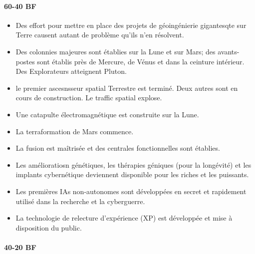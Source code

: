\paragraph{60-40 BF} 

\begin{itemize} 
   \item Des effort pour mettre en place des projets de géoingénierie
      gigantesqte sur Terre causent autant de problème qu'ils n'en résolvent. 
   \item Des colonnies majeures sont établies sur la Lune et sur Mars; des
      avants-postes sont établis près de Mercure, de Vénus et dans la ceinture
      intérieur. Des Explorateurs atteignent Pluton. 
   \item le premier ascesnsseur spatial Terrestre est terminé. Deux autres sont
      en cours de construction. Le traffic spatial explose. 
   \item Une catapulte électromagnétique est construite sur la Lune. 
   \item La terraformation de Mars commence. 
   \item La fusion est maîtrisée et des centrales fonctionnelles sont établies. 
   \item Les amélioratiosn génétiques, les thérapies géniques (pour la
      longévité) et les implants cybernétique deviennent disponible pour les
      riches et les puissants. 
   \item Les premières IAs non-autonomes sont développées en secret et
      rapidement utilisé dans la recherche et la cyberguerre. 
   \item La technologie de relecture d'expérience (XP) est développée et mise à
      disposition du public.
\end{itemize} 

\paragraph{40-20 BF} 

